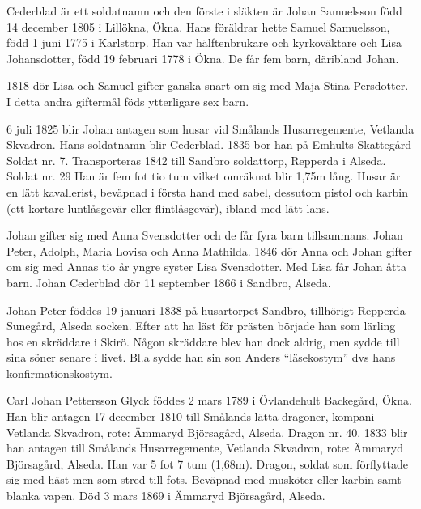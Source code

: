 

{\footline{}%

}


Cederblad är ett soldatnamn och den förste i släkten är Johan Samuelsson född 14 december 1805 i Lillökna, Ökna. Hans föräldrar hette Samuel Samuelsson, född 1 juni 1775 i Karlstorp. Han var hälftenbrukare och kyrkoväktare och Lisa Johansdotter, född 19 februari 1778 i Ökna. De får fem barn, däribland Johan.

1818 dör Lisa och Samuel gifter ganska snart om sig med Maja Stina Persdotter. I detta andra giftermål föds ytterligare sex barn.

6 juli 1825 blir Johan antagen som husar vid Smålands Husarregemente, Vetlanda Skvadron. Hans soldatnamn blir Cederblad. 1835 bor han på Emhults Skattegård Soldat nr. 7. Transporteras 1842 till Sandbro soldattorp, Repperda i Alseda. Soldat nr. 29 
Han är fem fot tio tum vilket omräknat blir 1,75m lång.
Husar är en lätt kavallerist, beväpnad i första hand med sabel, dessutom pistol och karbin (ett kortare luntlåsgevär eller flintlåsgevär), ibland med lätt lans.

Johan gifter sig med Anna Svensdotter och de får fyra barn tillsammans. Johan Peter, Adolph, Maria Lovisa och Anna Mathilda. 1846 dör Anna och Johan gifter om sig med Annas tio år yngre syster Lisa Svensdotter. Med Lisa får Johan åtta barn.
Johan Cederblad dör 11 september 1866 i Sandbro, Alseda.

Johan Peter föddes 19 januari 1838 på husartorpet Sandbro, tillhörigt Repperda Sunegård, Alseda socken.
Efter att ha läst för prästen började han som lärling hos en skräddare i Skirö. Någon skräddare blev han dock aldrig, men sydde till sina söner senare i livet. Bl.a sydde han sin son Anders “läsekostym” dvs hans konfirmationskostym.



Carl Johan Pettersson Glyck föddes 2 mars 1789 i Övlandehult Backegård, Ökna.
Han blir antagen 17 december 1810 till Smålands lätta dragoner, kompani Vetlanda Skvadron, rote: Ämmaryd Björsagård, Alseda. Dragon nr. 40.
1833 blir han antagen till Smålands Husarregemente, Vetlanda Skvadron, rote: Ämmaryd Björsagård, Alseda. Han var 5 fot 7 tum (1,68m).
Dragon, soldat som förflyttade sig med häst men som stred till fots. Beväpnad med musköter eller karbin samt blanka vapen.
Död 3 mars 1869 i Ämmaryd Björsagård, Alseda.

